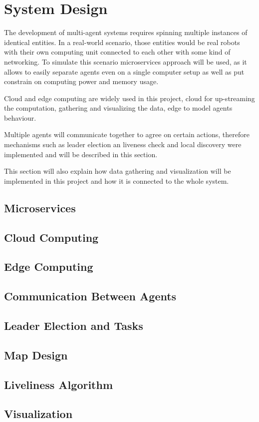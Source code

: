 \chapter{System Design}
The development of multi-agent systems requires spinning multiple instances of identical entities. In a real-world scenario, those entities would be real robots with their own computing unit connected to each other with some kind of networking. To simulate this scenario microservices approach will be used, as it allows to easily separate agents even on a single computer setup as well as put constrain on computing power and memory usage.

Cloud and edge computing are widely used in this project, cloud for up-streaming the computation, gathering and visualizing the data, edge to model agents behaviour.

Multiple agents will communicate together to agree on certain actions, therefore mechanisms such as leader election an liveness check and local discovery were implemented and will be described in this section.

This section will also explain how data gathering and visualization will be implemented in this project and how it is connected to the whole system.
\section{Microservices}


\section{Cloud Computing}


\section{Edge Computing}


\section{Communication Between Agents}


\section{Leader Election and Tasks}


\section{Map Design}


\section{Liveliness Algorithm}


\section{Visualization}
\label{sec:0308}
